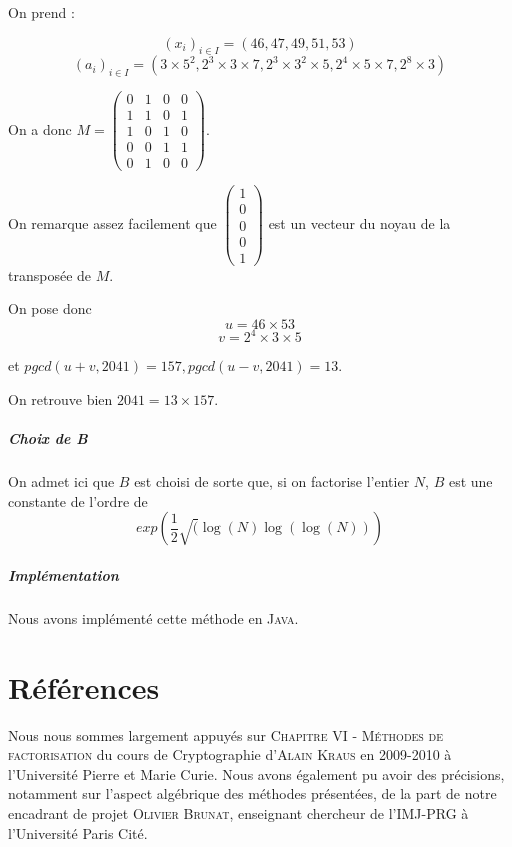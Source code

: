 \documentclass[11pt,a4paper]{article}
\begin{document}
	On prend : 
	
	$$(x_i)_{i \in I} = (46, 47, 49, 51, 53)$$
	$$(a_i)_{i \in I} = (3 \times 5^2, 2^3 \times 3 \times 7, 2^3 \times 3^2 \times 5, 2^4 \times 5 \times 7, 2^8 \times 3)$$
	
	On a donc $M = 
	\begin{pmatrix}
		0 & 1 & 0 & 0 \\
		1 & 1 & 0 & 1 \\
		1 & 0 & 1 & 0 \\
		0 & 0 & 1 & 1 \\
		0 & 1 & 0 & 0 
	\end{pmatrix}$.

 	On remarque assez facilement que 
 	$\begin{pmatrix}
 		1\\
 		0\\
 		0\\
 		0\\
 		1
 	\end{pmatrix}$ est un vecteur du noyau de la transposée de $M$.
 
 	On pose donc 
 	$$ u = 46 \times 53 $$ 
 	$$ v = 2^4 \times 3 \times 5$$
 	
 	et $pgcd(u+v, 2041) = 157, pgcd(u-v, 2041) = 13$.
 	
 	On retrouve bien $2041 = 13 \times 157$.
 	
 	
 	\subparagraph{Choix de B}
	
	On admet ici que $B$ est choisi de sorte que, si on factorise l'entier $N$, $B$ est une constante de l'ordre de 
	$$exp(\frac{1}{2} \sqrt(\log(N) \log(\log(N)))$$
		
	\subparagraph{Implémentation}
	Nous avons implémenté cette méthode en \textsc{Java}.
	
	\newpage
	\section{\LARGE{Références}}
	Nous nous sommes largement appuyés sur \textsc{Chapitre VI - Méthodes de factorisation} du cours de Cryptographie d'\textsc{Alain Kraus} en 2009-2010 à l'Université Pierre et Marie Curie. Nous avons également pu avoir des précisions, notamment sur l'aspect algébrique des méthodes présentées, de la part de notre encadrant de projet \textsc{Olivier Brunat}, enseignant chercheur de l'IMJ-PRG à l'Université Paris Cité.
	
\end{document}
